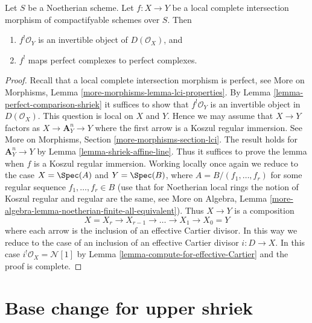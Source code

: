 \begin{lemma}
\label{lemma-lci-shriek}
Let $S$ be a Noetherian scheme. Let $f : X \to Y$ be a local complete
intersection morphism of compactifyable schemes over $S$. Then
\begin{enumerate}
\item $f^!\mathcal{O}_Y$ is an invertible object of $D(\mathcal{O}_X)$, and
\item $f^!$ maps perfect complexes to perfect complexes.
\end{enumerate}
\end{lemma}

\begin{proof}
Recall that a local complete intersection morphism is perfect, see
More on Morphisms, Lemma \ref{more-morphisms-lemma-lci-properties}.
By Lemma \ref{lemma-perfect-comparison-shriek} it suffices to show
that $f^!\mathcal{O}_Y$ is an invertible object in $D(\mathcal{O}_X)$.
This question is local on $X$ and $Y$. Hence we may assume that $X \to Y$
factors as $X \to \mathbf{A}^n_Y \to Y$ where the first arrow is a
Koszul regular immersion. See More on Morphisms, Section
\ref{more-morphisms-section-lci}.
The result holds for $\mathbf{A}^n_Y \to Y$
by Lemma \ref{lemma-shriek-affine-line}. Thus it suffices to prove
the lemma when $f$ is a Koszul regular immersion.
Working locally once again we reduce to the case
$X = \Spec(A)$ and $Y = \Spec(B)$, where $A = B/(f_1, \ldots, f_r)$
for some regular sequence $f_1, \ldots, f_r \in B$
(use that for Noetherian local rings the notion of Koszul
regular and regular are the same, see
More on Algebra, Lemma
\ref{more-algebra-lemma-noetherian-finite-all-equivalent}).
Thus $X \to Y$ is a composition
$$
X = X_r \to X_{r - 1} \to \ldots \to X_1 \to X_0 = Y
$$
where each arrow is the inclusion of an effective Cartier divisor.
In this way we reduce to the case of an inclusion of an effective
Cartier divisor $i : D \to X$. In this case
$i^!\mathcal{O}_X = \mathcal{N}[1]$ by
Lemma \ref{lemma-compute-for-effective-Cartier} and the proof is complete.
\end{proof}







\section{Base change for upper shriek}
\label{section-base-change-shriek}

